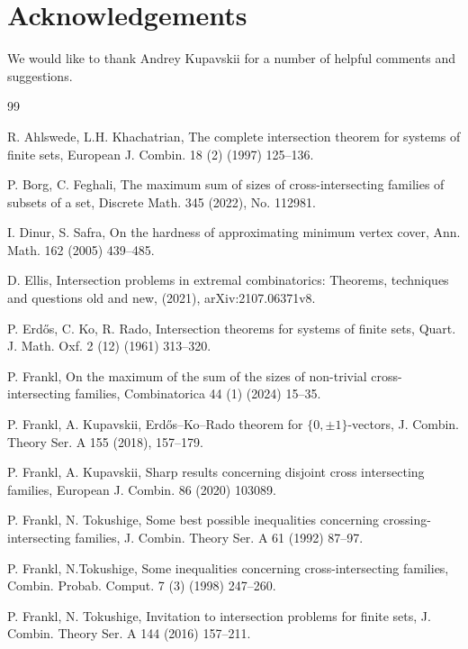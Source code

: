 \documentclass[a4paper,11pt]{article}
\begin{document}
\section{Acknowledgements}
We would like to thank Andrey Kupavskii for a number of helpful comments and suggestions.


\frenchspacing
\begin{thebibliography}{99}


R. Ahlswede, L.H. Khachatrian, The complete intersection theorem for systems of finite sets, European J. Combin. 18 (2) (1997) 125--136.

P. Borg, C. Feghali, The maximum sum of sizes of cross-intersecting families of subsets of a set, Discrete Math. 345 (2022), No. 112981.



I. Dinur, S. Safra, On the hardness of approximating minimum vertex cover, Ann. Math. 162 (2005) 439--485.

D. Ellis,
Intersection problems in extremal combinatorics: Theorems, techniques and questions old and new,
(2021), arXiv:2107.06371v8.


P. Erd\H{o}s, C. Ko, R. Rado, Intersection theorems for systems of finite sets,
Quart. J. Math. Oxf. 2 (12) (1961) 313--320.

 P. Frankl,
 On the maximum of the sum of the sizes of non-trivial cross-intersecting families,
 Combinatorica 44 (1)  (2024) 15--35.

P. Frankl, A. Kupavskii, Erd\H{o}s--Ko--Rado theorem for $\{0, ±1\}$-vectors,
J. Combin. Theory Ser. A 155 (2018), 157--179.

P. Frankl, A. Kupavskii, Sharp results concerning disjoint cross intersecting
families, European J. Combin. 86 (2020) 103089.

P. Frankl, N. Tokushige, Some best possible inequalities concerning crossing-intersecting families, J. Combin. Theory Ser. A 61 (1992) 87--97.

P. Frankl, N.Tokushige,  Some inequalities concerning cross-intersecting families,
Combin. Probab. Comput. 7 (3) (1998) 247--260.

P. Frankl, N. Tokushige, Invitation to intersection problems for finite sets,  J. Combin. Theory Ser. A 144 (2016) 157--211.




\end{thebibliography}
\end{document}
